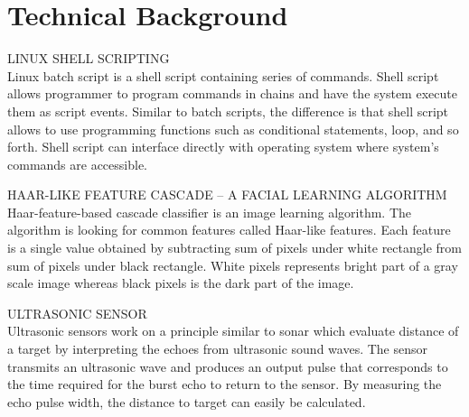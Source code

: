 \section{Technical Background}
LINUX SHELL SCRIPTING\\
Linux batch script is a shell script containing series of commands. Shell script allows programmer to program commands in chains and have the system execute them as script events. Similar to batch scripts, the difference is that shell script allows to use programming functions such as conditional statements, loop, and so forth. Shell script can interface directly with operating system where system’s commands are accessible.

HAAR-LIKE FEATURE CASCADE – A FACIAL LEARNING ALGORITHM\\
Haar-feature-based cascade classifier is an image learning algorithm. The algorithm is looking for common features called Haar-like features. Each feature is a single value obtained by subtracting sum of pixels under white rectangle from sum of pixels under black rectangle. White pixels represents bright part of a gray scale image whereas black pixels is the dark part of the image.

ULTRASONIC SENSOR\\
Ultrasonic sensors work on a principle similar to sonar which evaluate distance of a target by interpreting the echoes from ultrasonic sound waves. The sensor transmits an ultrasonic wave and produces an output pulse that corresponds to the time required for the burst echo to return to the sensor. By measuring the echo pulse width, the distance to target can easily be calculated.


